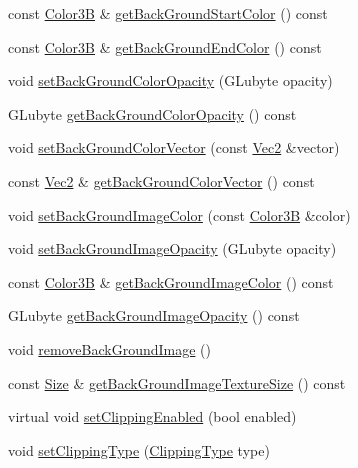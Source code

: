 \begin{DoxyCompactItemize}
\item 
const \hyperlink{structColor3B}{Color3B} \& \hyperlink{classui_1_1Layout_ac61aae4587926c5987538dcf4593b0db}{get\+Back\+Ground\+Start\+Color} () const
\item 
const \hyperlink{structColor3B}{Color3B} \& \hyperlink{classui_1_1Layout_a6906e65eb8e0c88b1e1e1e32148f7bc8}{get\+Back\+Ground\+End\+Color} () const
\item 
void \hyperlink{classui_1_1Layout_a69462211ca370314a9f2f9cda130c38d}{set\+Back\+Ground\+Color\+Opacity} (G\+Lubyte opacity)
\item 
G\+Lubyte \hyperlink{classui_1_1Layout_a1635ca93fd35f356f5998a7f6d27ae16}{get\+Back\+Ground\+Color\+Opacity} () const
\item 
void \hyperlink{classui_1_1Layout_aef84038235433bc37df14b05f3a24a6c}{set\+Back\+Ground\+Color\+Vector} (const \hyperlink{classVec2}{Vec2} \&vector)
\item 
const \hyperlink{classVec2}{Vec2} \& \hyperlink{classui_1_1Layout_a5480d653a8c352f30dbd9088b0ebca1f}{get\+Back\+Ground\+Color\+Vector} () const
\item 
void \hyperlink{classui_1_1Layout_acad2194099548020e1fe05c4c358c2fb}{set\+Back\+Ground\+Image\+Color} (const \hyperlink{structColor3B}{Color3B} \&color)
\item 
void \hyperlink{classui_1_1Layout_a736ea1d892fa9343b03a3c6a1b92ac38}{set\+Back\+Ground\+Image\+Opacity} (G\+Lubyte opacity)
\item 
const \hyperlink{structColor3B}{Color3B} \& \hyperlink{classui_1_1Layout_ac962ad946d770befb7bee1cc2c977c22}{get\+Back\+Ground\+Image\+Color} () const
\item 
G\+Lubyte \hyperlink{classui_1_1Layout_af77ed069ce97332a6baab5fe81bfef2d}{get\+Back\+Ground\+Image\+Opacity} () const
\item 
void \hyperlink{classui_1_1Layout_a5ccd3cef17fe9ae4ed0d76f2d07a96ce}{remove\+Back\+Ground\+Image} ()
\item 
const \hyperlink{classSize}{Size} \& \hyperlink{classui_1_1Layout_ac5edba295024c73b78a689e008ef8e1e}{get\+Back\+Ground\+Image\+Texture\+Size} () const
\item 
virtual void \hyperlink{classui_1_1Layout_ad8b2d7b694acba184356fe2a4680f192}{set\+Clipping\+Enabled} (bool enabled)
\item 
void \hyperlink{classui_1_1Layout_aed2e7279ffe4d9fda5820917a36b71db}{set\+Clipping\+Type} (\hyperlink{classui_1_1Layout_acd2a398e83d7d467e9565d4db171c865}{Clipping\+Type} type)
\item 

\end{DoxyCompactItemize}
